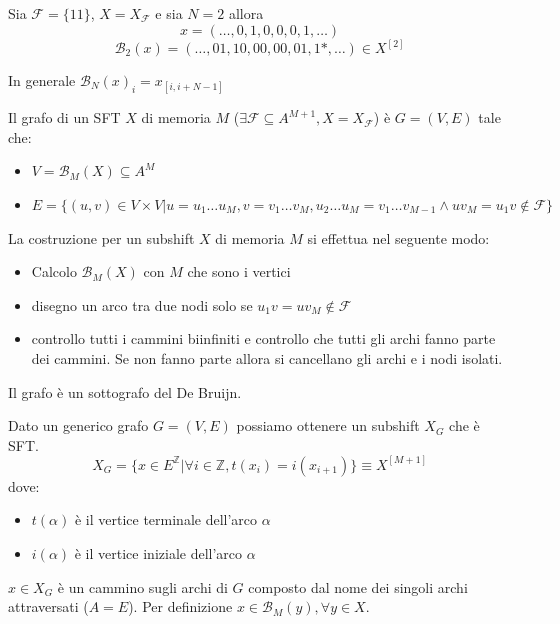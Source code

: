 \begin{esempio}
    Sia $\mathcal{F}=\{11\}$, $X = X_\mathcal{F}$ e sia $N=2$ allora 
    $$x=(\dots, 0,1,0,0,0,1,\dots)$$
    $$\mathcal{B}_2(x)=(\dots, 01,10,00,00,01,1\ast,\dots)\in X^{[2]}$$

    In generale $\mathcal{B}_N(x)_i = x_{[i, i+N-1]}$
\end{esempio}

\begin{definizione} 
    Il grafo di un SFT $X$ di memoria $M$ ($\exists \mathcal{F}\subseteq A^{M+1}, X= X_\mathcal{F}$) 
    è $G=(V,E)$ tale che:
    \begin{itemize}
        \item $V = \mathcal{B}_M(X)\subseteq A^M$
        \item $E = \{(u,v)\in V\times V | u = u_1\dots u_M, v= v_1\dots v_M,u_2\dots u_M = v_1\dots v_{M-1}\land uv_M= u_1v \not \in \mathcal{F}\}$ 
    \end{itemize}
\end{definizione}

La costruzione per un subshift $X$ di memoria $M$ si effettua nel seguente modo:
\begin{itemize}
    \item Calcolo $\mathcal{B}_M(X)$ con $M$ che sono i vertici
    \item disegno un arco tra due nodi solo se $u_1v=uv_M \not \in \mathcal{F}$
    \item controllo tutti i cammini biinfiniti e controllo che tutti gli archi 
    fanno parte dei cammini. Se non fanno parte allora si cancellano gli archi e i
    nodi isolati.
\end{itemize}

Il grafo è un sottografo del De Bruijn.

Dato un generico grafo $G=(V,E)$ possiamo ottenere un subshift $X_G$ che è SFT.
$$X_G=\{x\in E^\mathbb{Z}|\forall i\in\mathbb{Z}, t(x_i) = i(x_{i+1}) \}\equiv X^{[M+1]}$$
dove:
\begin{itemize}
    \item $t(\alpha)$ è il vertice terminale dell'arco $\alpha$
    \item $i(\alpha)$ è il vertice iniziale dell'arco $\alpha$
\end{itemize}

$x \in X_G$ è un cammino sugli archi di $G$ composto dal nome dei singoli archi attraversati ($A= E$).
Per definizione $x\in \mathcal{B}_M(y), \forall y\in X$.

